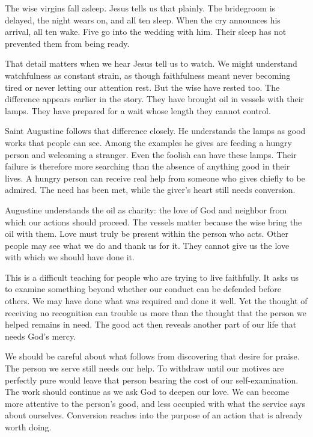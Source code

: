 The wise virgins fall asleep. Jesus tells us that plainly. The bridegroom is delayed, the night wears on, and all ten sleep. When the cry announces his arrival, all ten wake. Five go into the wedding with him. Their sleep has not prevented them from being ready.

That detail matters when we hear Jesus tell us to watch. We might understand watchfulness as constant strain, as though faithfulness meant never becoming tired or never letting our attention rest. But the wise have rested too. The difference appears earlier in the story. They have brought oil in vessels with their lamps. They have prepared for a wait whose length they cannot control.

Saint Augustine follows that difference closely. He understands the lamps as good works that people can see. Among the examples he gives are feeding a hungry person and welcoming a stranger. Even the foolish can have these lamps. Their failure is therefore more searching than the absence of anything good in their lives. A hungry person can receive real help from someone who gives chiefly to be admired. The need has been met, while the giver's heart still needs conversion.

Augustine understands the oil as charity: the love of God and neighbor from which our actions should proceed. The vessels matter because the wise bring the oil with them. Love must truly be present within the person who acts. Other people may see what we do and thank us for it. They cannot give us the love with which we should have done it.

This is a difficult teaching for people who are trying to live faithfully. It asks us to examine something beyond whether our conduct can be defended before others. We may have done what was required and done it well. Yet the thought of receiving no recognition can trouble us more than the thought that the person we helped remains in need. The good act then reveals another part of our life that needs God's mercy.

We should be careful about what follows from discovering that desire for praise. The person we serve still needs our help. To withdraw until our motives are perfectly pure would leave that person bearing the cost of our self-examination. The work should continue as we ask God to deepen our love. We can become more attentive to the person's good, and less occupied with what the service says about ourselves. Conversion reaches into the purpose of an action that is already worth doing.

